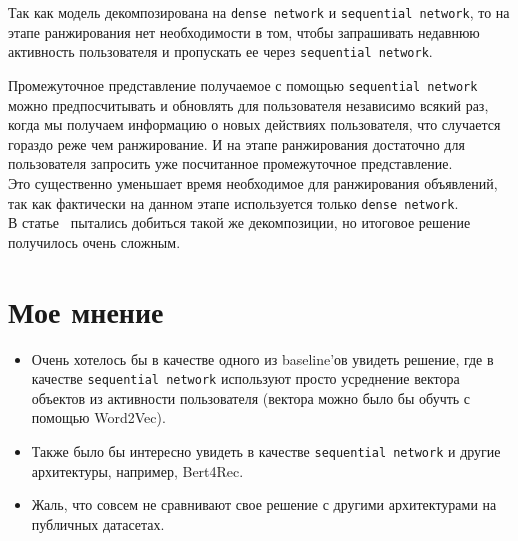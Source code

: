 Так как модель декомпозирована на \texttt{dense network} и \texttt{sequential network}, то на этапе ранжирования нет необходимости в том, чтобы запрашивать недавнюю активность пользователя и пропускать ее через \texttt{sequential network}. 

Промежуточное представление получаемое с помощью \texttt{sequential network} можно предпосчитывать и обновлять для пользователя независимо всякий раз, когда мы получаем информацию о новых действиях пользователя, что случается гораздо реже чем ранжирование. И на этапе ранжирования достаточно для пользователя запросить уже посчитанное промежуточное представление. \\

Это существенно уменьшает время необходимое для ранжирования объявлений, так как фактически на данном этапе используется только \texttt{dense network}. \\

В статье~\cite{pi2019practice} пытались добиться такой же декомпозиции, но итоговое решение получилось очень сложным.

\section{Мое мнение}

\begin{itemize}
    \item Очень хотелось бы в качестве одного из baseline'ов увидеть решение, где в качестве \texttt{sequential network} используют просто усреднение вектора объектов из активности пользователя (вектора можно было бы обучть с помощью Word2Vec).
    \item Также было бы интересно увидеть в качестве \texttt{sequential network} и другие архитектуры, например, Bert4Rec.
    \item Жаль, что совсем не сравнивают свое решение с другими архитектурами на публичных датасетах.
\end{itemize}